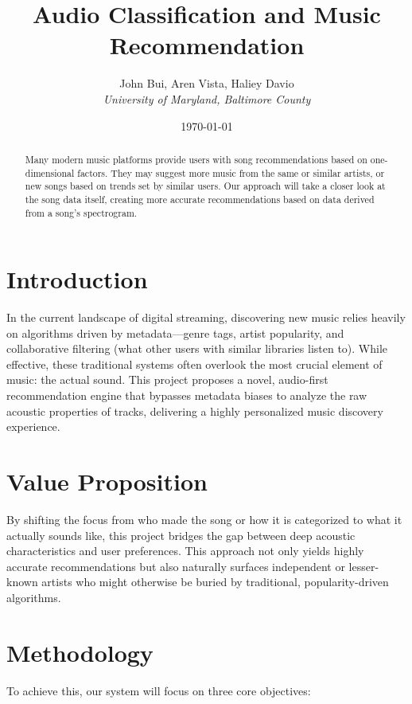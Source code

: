 \documentclass[10pt, twocolumn]{article}
\title{Audio Classification and Music Recommendation}
\author{
  John Bui, Aren Vista, Haliey Davio \\
  \textit{University of Maryland, Baltimore County}
}
\date{\today}
\begin{document}
\maketitle

\begin{abstract}
	Many modern music platforms provide users with song recommendations based on one-dimensional factors. They may suggest more music from the same or similar artists, or new songs based on trends set by similar users. Our approach will take a closer look at the song data itself, creating more accurate recommendations based on data derived from a song's spectrogram.
\end{abstract}

\section{Introduction}

In the current landscape of digital streaming, discovering new music relies heavily on algorithms driven by metadata—genre tags, artist popularity, and collaborative filtering (what other users with similar libraries listen to). While effective, these traditional systems often overlook the most crucial element of music: the actual sound. This project proposes a novel, audio-first recommendation engine that bypasses metadata biases to analyze the raw acoustic properties of tracks, delivering a highly personalized music discovery experience.

\section{Value Proposition}
By shifting the focus from who made the song or how it is categorized to what it actually sounds like, this project bridges the gap between deep acoustic characteristics and user preferences. This approach not only yields highly accurate recommendations but also naturally surfaces independent or lesser-known artists who might otherwise be buried by traditional, popularity-driven algorithms.

\pagebreak
\section{Methodology}
To achieve this, our system will focus on three core objectives:
\end{document}
